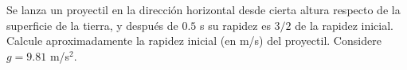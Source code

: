 Se lanza un proyectil en la dirección horizontal desde cierta altura respecto de la superficie de la tierra, y después de $0.5$ s su rapidez es $3/2$ de la rapidez inicial. Calcule aproximadamente la rapidez inicial (en m/s) del proyectil. Considere $g = 9.81$ m/s$^2$.
